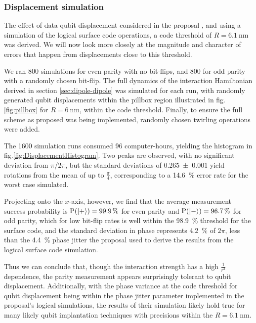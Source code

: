 
\subsubsection{Displacement simulation}\label{sec:DisplacementSimulation}
The effect of data qubit displacement considered in the proposal \cite{OGorman2016}, and using a simulation of the logical surface code operations, a code threshold of $R=\SI{6.1}{\nano\metre}$ was derived. We will now look more closely at the magnitude and character of errors that happen from displacements close to this threshold. 

We ran 800 simulations for even parity with no bit-flips, and 800 for odd parity with a randomly chosen bit-flip. The full dynamics of the interaction Hamiltonian derived in section \ref{sec:dipole-dipole} was simulated for each run, with randomly generated qubit displacements within the pillbox region illustrated in fig.\@ \ref{fig:pillbox} for $R = \SI{6}{\nano\metre}$, within the code threshold. Finally, to ensure the full scheme as proposed was being implemented, randomly chosen twirling operations were added.

The 1600 simulation runs consumed 96 computer-hours, yielding the histogram in fig.\@ \ref{fig:DisplacementHistogram}. Two peaks are observed, with no significant deviation from $\pi$/$2\pi$, but the standard deviations of \num{0.265+-0.001} yield rotations from the mean of up to $\tfrac{\pi}{4}$, corresponding to a \SI{14.6}{\percent} error rate for the worst case simulated.

Projecting onto the $x$-axis, however, we find that the average measurement success probability is $\mathrm{P(\ket{+}) = \SI{99.9}{\percent}}$ for even parity and $\mathrm{P(\ket{-}) = \SI{96.7}{\percent}}$ for odd parity, which for low bit-flip rates is well within the \SI{98.9}{\percent} threshold for the surface code, and the standard deviation in phase represents \SI{4.2}{\percent} of $2\pi$, less than the \SI{4.4}{\percent} phase jitter the proposal \cite{OGorman2016} used to derive the results from the logical surface code simulation.

Thus we can conclude that, though the interaction strength has a high $\tfrac{1}{r^3}$ dependence, the parity measurement appears surprisingly tolerant to qubit displacement. Additionally, with the phase variance at the code threshold for qubit displacement being within the phase jitter parameter implemented in the proposal's logical simulations, the results of their simulation likely hold true for many likely qubit implantation techniques with precisions within the $R=\SI{6.1}{\nano\metre}$.


